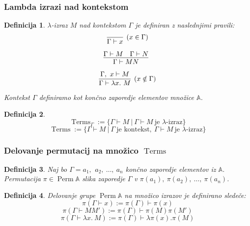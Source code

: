 \documentclass{beamer}
\DeclareMathOperator{\Perm}{Perm}
\DeclareMathOperator{\Terms}{Terms}
\newcommand{\inference}[3][]{\infer[#1]{#3}{#2}}
\newtheorem{definicija}{Definicija}
\begin{document}
\begin{frame}[fragile]
\frametitle{Lambda izrazi nad kontekstom}


\begin{definicija}
    \(\lambda\)-izraz \(M\) nad kontekstom \(\Gamma\) je definiran z naslednjimi pravili:
    \[
        \inference[(x \in \Gamma)]{}{\Gamma \vdash x}
    \]
    \[
        \inference{\Gamma \vdash M \quad \Gamma \vdash N}{\Gamma \vdash M N}
    \]
    \[
        \inference[(x \notin \Gamma)]{\Gamma,\ x \vdash M}{\Gamma \vdash \lambda x.\ M}    
    \]
Kontekst \(\Gamma\) definiramo kot končno zaporedje elementov množice \(\mathds{A}\).
\end{definicija}
\pause
\begin{definicija}
\[
    \Terms_{\Gamma} := \{\Gamma \vdash M\ |\ \Gamma \vdash M \ \text{je \(\lambda\)-izraz}\}
\]
\[
    \Terms := \{\Gamma \vdash M\ |\ \Gamma\ \text{je kontekst},\ \Gamma \vdash M \ \text{je \(\lambda\)-izraz}\}
\]
\end{definicija}
\end{frame}



\begin{frame}[fragile]
\frametitle{Delovanje permutacij na množico \(\Terms\)}

\begin{definicija}
    Naj bo \(\Gamma = a_1,\,\ a_2,\ \ldots,\ a_n\) končno zaporedje elementov iz \(\mathds{A}\). Permutacija \(\pi \in \Perm\mathds{A}\) slika zaporedje \(\Gamma\) v \(\pi(a_1), \ \pi(a_2), \ \ldots, \ \pi(a_n)\).
\end{definicija}
\pause
\begin{definicija}
    Delovanje grupe \(\Perm{\mathds{A}}\) na množico izrazov je definirano sledeče:
    \[
        \pi(\Gamma \vdash x) := \pi(\Gamma) \vdash \pi(x)
    \]
    \[
        \pi(\Gamma \vdash MM') := \pi(\Gamma ) \vdash \pi(M)\pi(M')
    \]
    \[
        \pi(\Gamma \vdash \lambda x.\ M) := \pi(\Gamma) \vdash \lambda \pi(x). \pi(M)
    \]
\end{definicija}



\end{frame}
\end{document}
